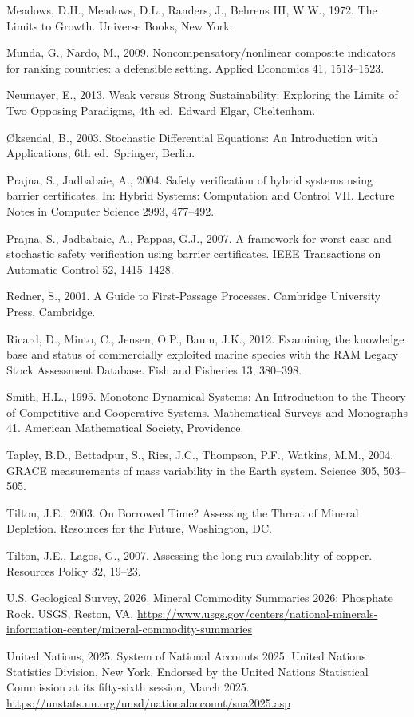 \documentclass[11pt]{article}
\begin{document}
Meadows, D.H., Meadows, D.L., Randers, J., Behrens III, W.W., 1972. The
Limits to Growth. Universe Books, New York.

Munda, G., Nardo, M., 2009. Noncompensatory/\allowbreak{}nonlinear composite
indicators for ranking countries: a defensible setting. Applied
Economics 41, 1513--1523.

Neumayer, E., 2013. Weak versus Strong Sustainability: Exploring the
Limits of Two Opposing Paradigms, 4th ed.~Edward Elgar, Cheltenham.

\O{}ksendal, B., 2003. Stochastic Differential Equations: An Introduction
with Applications, 6th ed.~Springer, Berlin.

Prajna, S., Jadbabaie, A., 2004. Safety verification of hybrid systems using barrier certificates. In: Hybrid Systems: Computation and Control VII. Lecture Notes in Computer Science 2993, 477--492.

Prajna, S., Jadbabaie, A., Pappas, G.J., 2007. A framework for worst-case and stochastic safety verification using barrier certificates. IEEE Transactions on Automatic Control 52, 1415--1428.

Redner, S., 2001. A Guide to First-Passage Processes. Cambridge
University Press, Cambridge.

Ricard, D., Minto, C., Jensen, O.P., Baum, J.K., 2012. Examining the
knowledge base and status of commercially exploited marine species with
the RAM Legacy Stock Assessment Database. Fish and Fisheries 13,
380--398.

Smith, H.L., 1995. Monotone Dynamical Systems: An Introduction to the Theory of Competitive and Cooperative Systems. Mathematical Surveys and Monographs 41. American Mathematical Society, Providence.

Tapley, B.D., Bettadpur, S., Ries, J.C., Thompson, P.F., Watkins, M.M.,
2004. GRACE measurements of mass variability in the Earth system.
Science 305, 503--505.

Tilton, J.E., 2003. On Borrowed Time? Assessing the Threat of Mineral
Depletion. Resources for the Future, Washington, DC.

Tilton, J.E., Lagos, G., 2007. Assessing the long-run availability of
copper. Resources Policy 32, 19--23.

U.S. Geological Survey, 2026. Mineral Commodity Summaries 2026:
Phosphate Rock. USGS, Reston, VA.
\url{https://www.usgs.gov/centers/national-minerals-information-center/mineral-commodity-summaries}

United Nations, 2025. System of National Accounts 2025. United Nations Statistics Division, New York. Endorsed by the United Nations Statistical Commission at its fifty-sixth session, March 2025. \url{https://unstats.un.org/unsd/nationalaccount/sna2025.asp}
\end{document}
